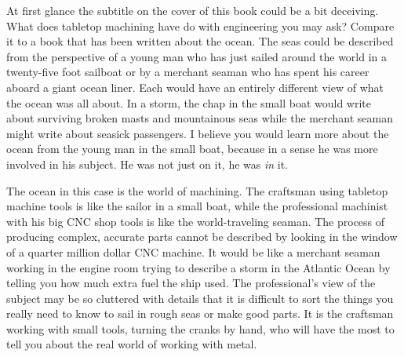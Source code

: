 
\secdown

\secdown


At first glance the subtitle on the cover of this book could be a bit deceiving.
What does tabletop machining have do with engineering you may ask? Compare it to
a book that has been written about the ocean. The seas could be described from
the perspective of a young man who has just sailed around the world in a
twenty-five foot sailboat or by a merchant seaman who has spent his career
aboard a giant ocean liner. Each would have an entirely different view of what
the ocean was all about. In a storm, the chap in the small boat would write
about surviving broken masts and mountainous seas while the merchant seaman
might write about seasick passengers. I believe you would learn more about the
ocean from the young man in the small boat, because in a sense he was more
involved in his subject. He was not just on it, he was \textit{in} it.


The ocean in this case is the world of machining. The craftsman using tabletop
machine tools is like the sailor in a small boat, while the professional
machinist with his big CNC shop tools is like the world-traveling seaman. The
process of producing complex, accurate parts cannot be described by looking in
the window of a quarter million dollar CNC machine. It would be like a merchant
seaman working in the engine room trying to describe a storm in the Atlantic
Ocean by telling you how much extra fuel the ship used. The professional's view
of the subject may be so cluttered with details that it is difficult to sort the
things you really need to know to sail in rough seas or make good parts. It is
the craftsman working with small tools, turning the cranks by hand, who will
have the most to tell you about the real world of working with metal.


